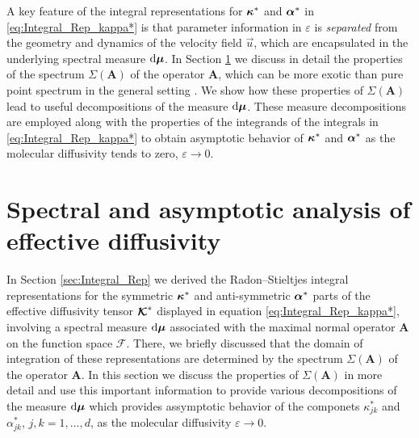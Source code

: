 \documentclass[11pt]{amsart}
\renewcommand{\d}{\mathrm{d}}
\newcommand{\Ab}{\mathbf{A}}
\newcommand\Kbc{\mbox{\boldmath${\mathcal{K}}$}}
\newcommand{\Fs}{\mathscr{F}}
\newcommand\bmu{\mbox{\boldmath${\mu}$}}
\newcommand\balpha{\mbox{\boldmath${\alpha}$}}
\newcommand\bkappa{\mbox{\boldmath${\kappa}$}}
\begin{document}
A key feature of the integral representations for $\bkappa^*$ and
$\balpha^*$ in \eqref{eq:Integral_Rep_kappa*} is that parameter
information in $\varepsilon$ is \emph{separated} from the geometry and dynamics
of the velocity field $\vec{u}$, which are encapsulated in the
underlying spectral measure $\d\bmu$. In Section
\ref{sec:Assymptotics} we discuss in 
detail the properties of the spectrum $\Sigma(\Ab)$ of the operator $\Ab$,
which can be more exotic than pure point spectrum in the general
setting \cite{Reed-1980,Stone:64}. We show how these properties of
$\Sigma(\Ab)$ lead to useful decompositions of the measure $\d\bmu$. These
measure decompositions are employed along with the properties of the 
integrands of the integrals in \eqref{eq:Integral_Rep_kappa*} to
obtain asymptotic behavior of $\bkappa^*$ and $\balpha^*$ as the
molecular diffusivity tends to zero, $\varepsilon\to0$.     









\section{Spectral and asymptotic analysis of effective
  diffusivity} \label{sec:Assymptotics}
%
In Section \ref{sec:Integral_Rep} we derived the Radon--Stieltjes
integral representations for the symmetric $\bkappa^*$ and
anti-symmetric $\balpha^*$ parts of the effective diffusivity tensor
$\Kbc^*$ displayed in equation \eqref{eq:Integral_Rep_kappa*},
involving a spectral measure $\d\bmu$ associated with the maximal
normal operator $\Ab$ on the function space $\Fs$. There, we briefly
discussed that the domain of integration of these representations are
determined by the spectrum $\Sigma(\Ab)$ of the operator $\Ab$. In this
section we discuss the properties of $\Sigma(\Ab)$ in more detail and use
this important information to provide various decompositions of the
measure $\d\bmu$ which provides assymptotic behavior of the componets
$\kappa^*_{jk}$ and $\alpha^*_{jk}$, $j,k=1,\ldots,d$, as the molecular diffusivity
$\varepsilon\to0$.
\end{document}

